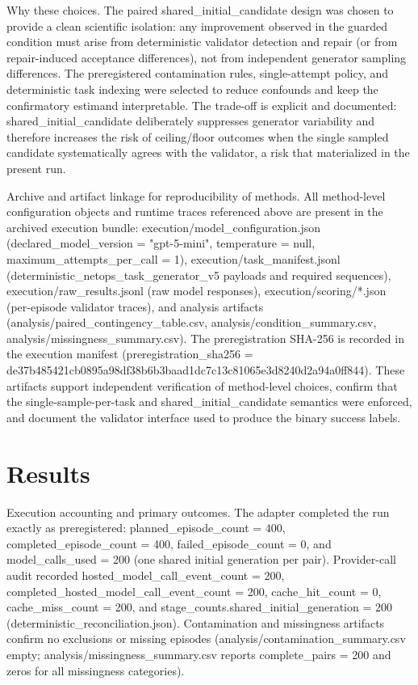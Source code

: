 \documentclass[conference]{IEEEtran}
\begin{document}
Why these choices. The paired shared\_initial\_candidate design was chosen to provide a clean scientific isolation: any improvement observed in the guarded condition must arise from deterministic validator detection and repair (or from repair-induced acceptance differences), not from independent generator sampling differences. The preregistered contamination rules, single-attempt policy, and deterministic task indexing were selected to reduce confounds and keep the confirmatory estimand interpretable. The trade-off is explicit and documented: shared\_initial\_candidate deliberately suppresses generator variability and therefore increases the risk of ceiling/floor outcomes when the single sampled candidate systematically agrees with the validator, a risk that materialized in the present run.

Archive and artifact linkage for reproducibility of methods. All method-level configuration objects and runtime traces referenced above are present in the archived execution bundle: execution/model\_configuration.json (declared\_model\_version = "gpt-5-mini", temperature = null, maximum\_attempts\_per\_call = 1), execution/task\_manifest.jsonl (deterministic\_netops\_task\_generator\_v5 payloads and required sequences), execution/raw\_results.jsonl (raw model responses), execution/scoring/*.json (per-episode validator traces), and analysis artifacts (analysis/paired\_contingency\_table.csv, analysis/condition\_summary.csv, analysis/missingness\_summary.csv). The preregistration SHA-256 is recorded in the execution manifest (preregistration\_sha256 = de37b485\allowbreak{}421cb089\allowbreak{}5a98df38\allowbreak{}b6b3baad\allowbreak{}1dc7c13c\allowbreak{}81065e3d\allowbreak{}8240d2a9\allowbreak{}4a0ff844). These artifacts support independent verification of method-level choices, confirm that the single-sample-per-task and shared\_initial\_candidate semantics were enforced, and document the validator interface used to produce the binary success labels.

\section{Results}
Execution accounting and primary outcomes. The adapter completed the run exactly as preregistered: planned\_episode\_count = 400, completed\_episode\_count = 400, failed\_episode\_count = 0, and model\_calls\_used = 200 (one shared initial generation per pair). Provider-call audit recorded hosted\_model\_call\_event\_count = 200, completed\_hosted\_model\_call\_event\_count = 200, cache\_hit\_count = 0, cache\_miss\_count = 200, and stage\_counts.shared\_initial\_generation = 200 (deterministic\_reconciliation.json). Contamination and missingness artifacts confirm no exclusions or missing episodes (analysis/contamination\_summary.csv empty; analysis/missingness\_summary.csv reports complete\_pairs = 200 and zeros for all missingness categories).
\end{document}
